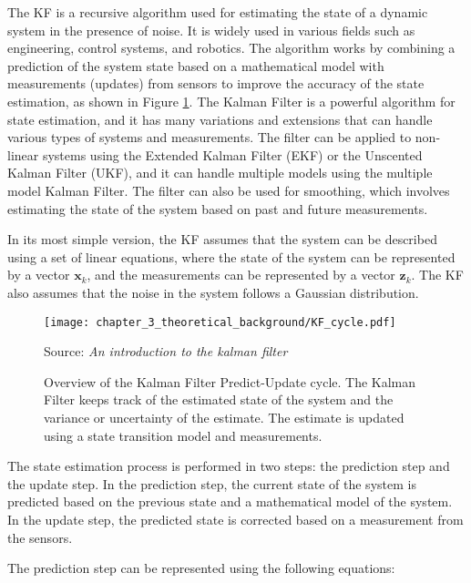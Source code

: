 The \acf{KF} \cite{kalman1960new} is a recursive algorithm used for estimating the state of a dynamic system in the presence of noise. It is widely used in various fields such as engineering, control systems, and robotics. The algorithm works by combining a prediction of the system state based on a mathematical model with measurements (updates) from sensors to improve the accuracy of the state estimation, as shown in Figure \ref{fig:chapter_3_theoretical_background/KF_cycle}. The Kalman Filter is a powerful algorithm for state estimation, and it has many variations and extensions that can handle various types of systems and measurements. The filter can be applied to non-linear systems using the Extended Kalman Filter (EKF) or the Unscented Kalman Filter (UKF), and it can handle multiple models using the multiple model Kalman Filter. The filter can also be used for smoothing, which involves estimating the state of the system based on past and future measurements.

In its most simple version, the \ac{KF} assumes that the system can be described using a set of linear equations, where the state of the system can be represented by a vector $\mathbf{x}_k$, and the measurements can be represented by a vector $\mathbf{z}_k$. The \ac{KF} also assumes that the noise in the system follows a Gaussian distribution.

\begin{figure}[!h]
	\centering
	\captionsetup{justification=justified}
	\texttt{[image: chapter\_3\_theoretical\_background/KF\_cycle.pdf]}
	\caption[Overview of the Kalman Filter Predict-Update cycle]{Overview of the Kalman Filter Predict-Update cycle. The Kalman Filter keeps track of the estimated state of the system and the variance or uncertainty of the estimate. The estimate is updated using a state transition model and measurements.}
	Source: \textit{An introduction to the kalman filter} \cite{bishop2001introduction}
	\label{fig:chapter_3_theoretical_background/KF_cycle}
\end{figure}

The state estimation process is performed in two steps: the prediction step and the update step. In the prediction step, the current state of the system is predicted based on the previous state and a mathematical model of the system. In the update step, the predicted state is corrected based on a measurement from the sensors.

The prediction step can be represented using the following equations:


